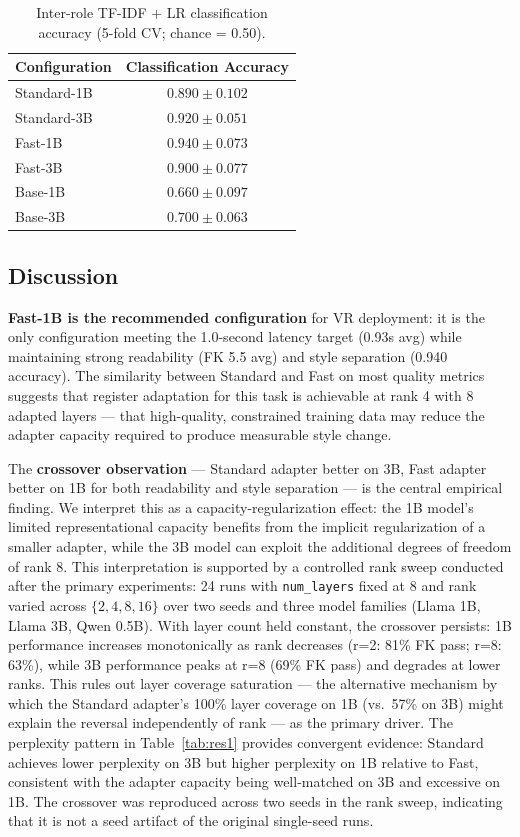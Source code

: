 \documentclass[journal]{IEEEtai}
\begin{document}
\begin{table}[!t]
  \centering
  \caption{Inter-role TF-IDF + LR classification accuracy (5-fold CV; chance = 0.50).}
  \label{tab:res4}
  \small
  \begin{tabular}{lc}
    \hline
    Configuration & Classification Accuracy \\
    \hline
    Standard-1B & $0.890 \pm 0.102$ \\
    Standard-3B & $0.920 \pm 0.051$ \\
    Fast-1B     & $0.940 \pm 0.073$ \\
    Fast-3B     & $0.900 \pm 0.077$ \\
    Base-1B     & $0.660 \pm 0.097$ \\
    Base-3B     & $0.700 \pm 0.063$ \\
    \hline
  \end{tabular}
\end{table}


\subsection{Discussion}\label{sec:discussion-crossover}

\textbf{Fast-1B is the recommended configuration} for VR deployment: it is the only configuration meeting the 1.0-second latency target (0.93s avg) while maintaining strong readability (FK 5.5 avg) and style separation (0.940 accuracy). The similarity between Standard and Fast on most quality metrics suggests that register adaptation for this task is achievable at rank 4 with 8 adapted layers --- that high-quality, constrained training data may reduce the adapter capacity required to produce measurable style change.

The \textbf{crossover observation} --- Standard adapter better on 3B, Fast adapter better on 1B for both readability and style separation --- is the central empirical finding. We interpret this as a capacity-regularization effect: the 1B model's limited representational capacity benefits from the implicit regularization of a smaller adapter, while the 3B model can exploit the additional degrees of freedom of rank 8. This interpretation is supported by a controlled rank sweep conducted after the primary experiments: 24 runs with \texttt{num\_layers} fixed at 8 and rank varied across $\{2, 4, 8, 16\}$ over two seeds and three model families (Llama 1B, Llama 3B, Qwen 0.5B). With layer count held constant, the crossover persists: 1B performance increases monotonically as rank decreases (r=2: 81\% FK pass; r=8: 63\%), while 3B performance peaks at r=8 (69\% FK pass) and degrades at lower ranks. This rules out layer coverage saturation --- the alternative mechanism by which the Standard adapter's 100\% layer coverage on 1B (vs.\ 57\% on 3B) might explain the reversal independently of rank --- as the primary driver. The perplexity pattern in Table~\ref{tab:res1} provides convergent evidence: Standard achieves lower perplexity on 3B but higher perplexity on 1B relative to Fast, consistent with the adapter capacity being well-matched on 3B and excessive on 1B. The crossover was reproduced across two seeds in the rank sweep, indicating that it is not a seed artifact of the original single-seed runs.
\end{document}
